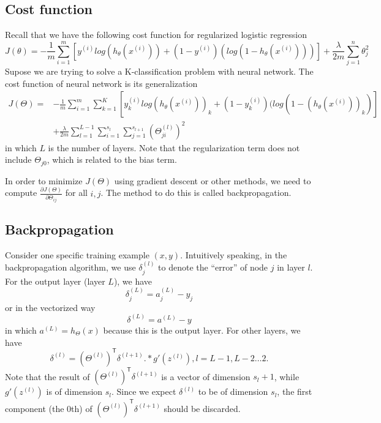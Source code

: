 \ifx\PREAMBLE\undefined


\fi
\subsection{Cost function}
Recall that we have the following cost function for regularized logistic regression
\begin{equation}
J(\theta) = -\frac{1}{m}\sum\limits_{i=1}^m\left[y^{(i)}log(h_{\theta}(x^{(i)})) + (1-y^{(i)})(log(1-h_{\theta}(x^{(i)})))\right] + \frac{\lambda}{2m}\sum\limits_{j=1}^{n}\theta_j^2
\end{equation}
Supose we are trying to solve a K-classification problem with neural network. The cost function of neural network is its generalization
\begin{equation}
\begin{split}
J(\Theta) = &-\frac{1}{m}\sum\limits_{i=1}^m\sum\limits_{k=1}^{K}\left[y^{(i)}_klog(h_{\theta}(x^{(i)}))_k + (1-y^{(i)}_k)(log(1-(h_{\theta}(x^{(i)}))_k)\right] \\
&+ \frac{\lambda}{2m}\sum\limits_{l=1}^{L-1}\sum\limits_{i=1}^{s_l}\sum\limits_{j=1}^{s_{l+1}}(\Theta_{ji}^{(l)})^2
\end{split}
\end{equation}
in which $L$ is the number of layers. Note that the regularization term does not include $\Theta_{j0}$, which is related to the bias term.

In order to minimize $J(\Theta)$ using gradient descent or other methods, we need to compute $\frac{\partial J(\Theta)}
{\partial \Theta_{ij}}$ for all $i,j$. The method to do this is called backpropagation.
\subsection{Backpropagation}
Consider one specific training example $(x,y)$. Intuitively speaking, in the backpropagation algorithm, we use $\delta_j^{(l)}$ to denote the ``error'' of node $j$ in layer $l$. For the output layer (layer $L$), we have 
\begin{equation}
\delta_j^{(L)} = a_j^{(L)} - y_j
\end{equation}
or in the vectorized way
\begin{equation}
\delta^{(L)} = a^{(L)} - y
\end{equation}
in which $a^{(L)} = h_{\Theta}(x)$ because this is the output layer. For other layers, we have
\begin{equation}
\delta^{(l)} = (\Theta^{(l)})^{\mathsf T}\delta^{(l+1)} .* g'(z^{(l)}),  l = L - 1, L - 2 \dots 2.
\end{equation}
Note that the result of $(\Theta^{(l)})^{\mathsf T}\delta^{(l+1)}$ is a vector of dimension $s_l + 1$, while $g'(z^{(l)})$ is of dimension $s_l$. Since we expect $\delta^{(l)}$ to be of dimension $s_l$, the first component (the 0th) of $(\Theta^{(l)})^{\mathsf T}\delta^{(l+1)}$ should be discarded.

